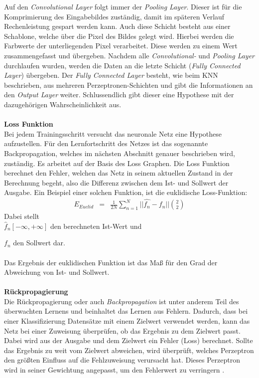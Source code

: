 Auf den \textit{Convolutional Layer} folgt immer der \textit{Pooling Layer}. Dieser ist für die Komprimierung des Eingabebildes zuständig, damit im späteren Verlauf Rechenleistung gespart werden kann. Auch diese Schicht besteht aus einer Schablone, welche über die Pixel des Bildes gelegt wird. Hierbei werden die Farbwerte der unterliegenden Pixel verarbeitet. Diese werden zu einem Wert zusammengefasst und übergeben. Nachdem alle \textit{Convolutional-} und \textit{Pooling Layer} durchlaufen wurden, werden die Daten an die letzte Schicht (\textit{Fully Connected Layer}) übergeben. Der \textit{Fully Connected Layer} besteht, wie beim KNN beschrieben, aus mehreren Perzeptronen-Schichten und gibt die Informationen an den \textit{Output Layer} weiter. Schlussendlich gibt dieser eine Hypothese mit der dazugehörigen Wahrscheinlichkeit aus.\\\\
\textbf{Loss Funktion}\\
Bei jedem Trainingsschritt versucht das neuronale Netz eine Hypothese aufzustellen. Für den Lernfortschritt des Netzes ist das sogenannte Backpropagation, welches im nächsten Abschnitt genauer beschrieben wird, zuständig. Es arbeitet auf der Basis des Loss Graphen. Die Loss Funktion berechnet den Fehler, welchen das Netz in seinem aktuellen Zustand in der Berechnung begeht, also die Differenz zwischen dem Ist- und Sollwert der Ausgabe. Ein Beispiel einer solchen Funktion, ist die euklidische Loss-Funktion:
\begin{eqnarray} E_{Euclid}&=&\frac{1}{2N} \sum_{n=1}^N || \hat{f_{n}}-f_{n} || \binom{2}{2} \end{eqnarray}
Dabei stellt\\

	$\hat{f}_{n}[-\infty,+\infty]$ den berechneten Ist-Wert und
	
	$f_{n}$ den Sollwert dar.\\\\
Das Ergebnis der euklidischen Funktion ist das Maß für den Grad der Abweichung von Ist- und Sollwert.\\\\
\textbf{Rückpropagierung}\\
Die Rückpropagierung oder auch \textit{Backpropagation} \cite{ertel2013grundkurs} ist unter anderem Teil des überwachten Lernens und beinhaltet das Lernen aus Fehlern. Dadurch, dass bei einer Klassifizierung Datensätze mit einem Zielwert verwendet werden, kann das Netz bei einer Zuweisung überprüfen, ob das Ergebnis zu dem Zielwert passt. Dabei wird aus der Ausgabe und dem Zielwert ein Fehler (Loss) berechnet. Sollte das Ergebnis zu weit vom Zielwert abweichen, wird überprüft, welches Perzeptron den größten Einfluss auf die Fehlzuweisung verursacht hat. Dieses Perzeptron wird in seiner Gewichtung angepasst, um den Fehlerwert zu verringern \cite{goodfellow2016deep}.  
